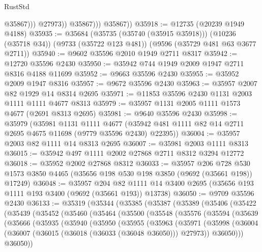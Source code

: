 \begin{lexlean}{RustStd}
\begin{coremodule}
                        @35867)))
                  @27973))
              @35867)))
        @35867))
@35918 := @12735 (@20239 @1949 @4188)
@35935 := @35684
    (@35735 (@35740 (@35915 @35918)))
    (@10236 (@35718 @34))
    (@9733 (@35722 @123 @481))
    (@9596 (@35729 @481 @63 @3677 @2711))
@35940 := @9602 @35596 @2010 @1949 @2711 @8317
@35942 := @12720 @35596 @2430
@35950 := @35942 @744 @1949 @2009 @1947 @2711 @8316 @4188 @11699
@35952 := @9663 @35596 @2430
@35955 := @35952 @2009 @1947 @8316
@35957 := @9672 @35596 @2430
@35963 := @35957 @2007 @82 @1929 @14 @8314 @2695
@35971 := @11853 @35596 @2430 @1131 @2003 @1111 @1111 @4677 @8313
@35979 := @35957 @1131 @2005 @1111 @1573 @4677 (@2691 @8313 @2695)
@35981 := @9640 @35596 @2430
@35998 := @35979
    (@35981
      @1131
      @1111
      @4677
      (@35942 @481 @1111 @82 @14 @2711 @2695 @4675 @11698 (@9779 @35596 @2430) @22395))
@36004 := @35957 @2003 @82 @1111 @14 @8313 @2695
@36007 := @35981 @2003 @1111 @8313
@36015 := @35942 @497 @1111 @2002 @27868 @2711 @8312 @3294 @12772
@36018 := @35952 @2002 @27868 @8312
@36033 := @35957
    @206
    @728
    @530
    @1573
    @3850
    @4465
    (@35656 @198 @530 @198 @3850 (@9692 (@35661 @198)) @17249)
@36048 := @35957
    @204
    @82
    @1111
    @14
    @3400
    @2695
    (@35656 @193 @1111 @193 @3400 (@9692 (@35661 @193)) @13738)
@36050 := @9709 @35596 @2430
@36133 := @35319
    (@35344
      (@35385
        (@35387
          (@35389
            (@35406
              (@35422
                (@35439
                  (@35452
                    (@35460
                      (@35464
                        (@35500
                          (@35548
                            (@35576
                              (@35594
                                (@35639
                                  (@35666
                                    (@35935
                                      (@35940
                                        (@35950
                                          (@35955
                                            (@35963
                                              (@35971
                                                (@35998
                                                  (@36004
                                                    (@36007
                                                      (@36015
                                                        (@36018 (@36033 (@36048 @36050)))
                                                        @27973))
                                                    @36050)))
                                              @36050))

\end{coremodule}
\end{lexlean}
